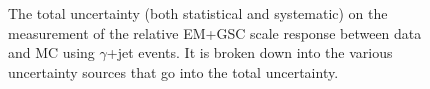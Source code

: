 \documentclass{article}
\begin{document}
\begin{figure}[!ht]
  \centering
  \begin{subfigure}{.7\textwidth}
    \centering
  \end{subfigure}%
  \begin{subfigure}{.3\textwidth}  \centering
  \end{subfigure}
  \caption[Uncertainty on the EM+GSC scale response measurement using $\gamma$+jet]
  {\small The total uncertainty (both statistical and systematic) on the measurement of the relative EM+GSC scale response between data and MC using $\gamma$+jet events.  It is broken down into the various uncertainty sources that go into the total uncertainty.  }
  \label{Fig:gJetSystsEM2016Main}
\end{figure}
\end{document}
